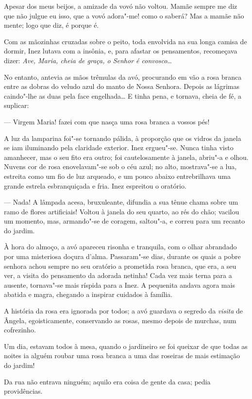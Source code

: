 Apesar dos meus beijos, a amizade da vovó não voltou. Mamãe sempre me
diz que não julgue eu isso, que a vovó adora"-me! como o saberá? Mas a
mamãe não mente; logo que diz, é porque é.

Com as mãozinhas cruzadas sobre o peito, toda envolvida na sua longa
camisa de dormir, Inez lutava com a insônia, e, para afastar os
pensamentos, recomeçava dizer: \emph{Ave, Maria, cheia de graça, o
Senhor é convosco}\ldots{}

No entanto, antevia as mãos trêmulas da avó, procurando em vão a rosa
branca entre as dobras do veludo azul do manto de Nossa Senhora. Depois
as lágrimas caindo"-lhe as duas pela face engelhada\ldots{} E tinha pena, e
tornava, cheia de fé, a suplicar:

--- Virgem Maria! fazei com que nasça uma rosa branca a vossos pés!

A luz da lamparina foi"-se tornando pálida, à proporção que os vidros da
janela se iam iluminando pela claridade exterior. Inez ergueu"-se. Nunca
tinha visto amanhecer, mas o seu fito era outro; foi cautelosamente à
janela, abriu"-a e olhou. Nuvens cor de rosa enovelavam"-se sob o céu
azul; no alto, mostrava"-se a lua, estreita como um fio de luz arqueado,
e um pouco abaixo entrebrilhava uma grande estrela esbranquiçada e fria.
Inez espreitou o oratório.

--- Nada! A lâmpada acesa, bruxuleante, difundia a sua tênue chama sobre
um ramo de flores artificiais! Voltou à janela do seu quarto, ao rés do
chão; vacilou um momento, mas, armando"-se de coragem, saltou"-a, e correu
para um recanto do jardim.

À hora do almoço, a avó apareceu risonha e tranquila, com o olhar
abrandado por uma misteriosa doçura d'alma. Passaram"-se dias, durante os
quais a pobre senhora achou sempre no seu oratório a prometida rosa
branca, que era, a seu ver, a visita do pensamento da adorada netinha!
Cada vez mais terna para a ausente, tornava"-se mais ríspida para a Inez.
A pequenita andava agora mais abatida e magra, chegando a inspirar
cuidados à família.

A história da rosa era ignorada por todos; a avó guardava o segredo da
\emph{visita} de Ângela, egoisticamente, conservando as rosas, mesmo
depois de murchas, num cofrezinho.

Um dia, estavam todos à mesa, quando o jardineiro se foi queixar de que
todas as noites ia alguém roubar uma rosa branca a uma das roseiras de
mais estimação do jardim!

Da rua não entrava ninguém; aquilo era coisa de gente da casa; pedia
providências.

